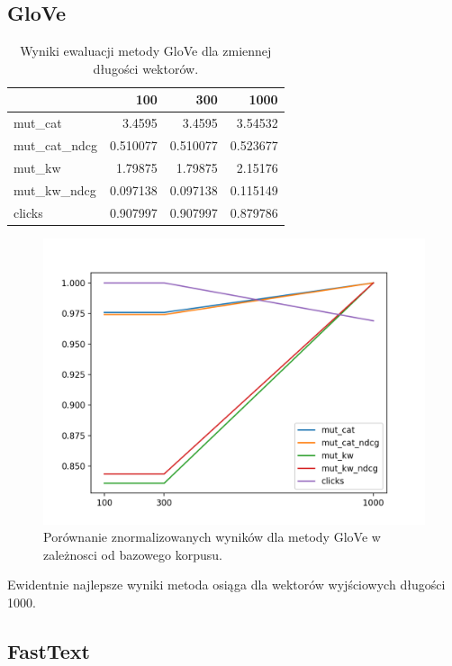 \documentclass[pl]{minipw} %
\begin{document}
\subsection{GloVe}

\begin{table}[H]
	\centering
	\begin{tabular}{lrrr}
		\hline
		&      100 &      300 &     1000 \\
		\hline
		mut\_cat      & 3.4595   & 3.4595   & 3.54532  \\
		mut\_cat\_ndcg & 0.510077 & 0.510077 & 0.523677 \\
		mut\_kw       & 1.79875  & 1.79875  & 2.15176  \\
		mut\_kw\_ndcg  & 0.097138 & 0.097138 & 0.115149 \\
		clicks       & 0.907997 & 0.907997 & 0.879786 \\
		\hline
	\end{tabular}
	\caption{Wyniki ewaluacji metody GloVe dla zmiennej długości wektorów.}
\end{table}

\begin{figure}[H]
	\centering
	\includegraphics[width=1\textwidth]{img/results/gv_ctr.png}
	\caption{Porównanie znormalizowanych wyników dla metody GloVe w zależnosci od bazowego korpusu.}
\end{figure}

Ewidentnie najlepsze wyniki metoda osiąga dla wektorów wyjściowych długości 1000.

\subsection{FastText}
\end{document}
